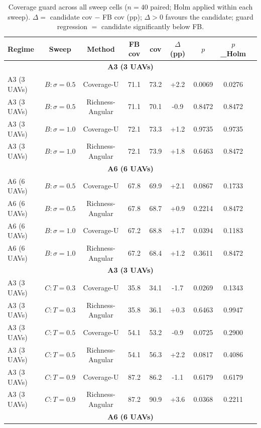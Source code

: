 \documentclass[journal]{IEEEtran}
\newcommand{\CU}{Coverage-U}
\newcommand{\RA}{Richness-Angular}
\begin{document}
\begin{table}[t]
\caption{Coverage guard across all sweep cells ($n = 40$ paired; Holm applied within each sweep). $\Delta =$ candidate cov $-$ FB cov (pp); $\Delta > 0$ favours the candidate; guard regression $=$ candidate significantly below FB.}
\label{tab:guard}
\centering
\small
\setlength{\tabcolsep}{4pt}
\begin{tabular}{l c c c c c c c c}
\toprule
Regime & Sweep & Method & FB cov & cov & $\Delta$ (pp) & $p$ & $p$\_Holm & \\
\midrule
\multicolumn{9}{c}{\textbf{A3 (3 UAVs)}} \\
\midrule
A3 (3 UAVs) & $B{:}\sigma{=}0.5$ & \CU & 71.1 & 73.2 & +2.2 & 0.0069 & 0.0276 &  \\
A3 (3 UAVs) & $B{:}\sigma{=}0.5$ & \RA & 71.1 & 70.1 & -0.9 & 0.8472 & 0.8472 &  \\
A3 (3 UAVs) & $B{:}\sigma{=}1.0$ & \CU & 72.1 & 73.3 & +1.2 & 0.9735 & 0.9735 &  \\
A3 (3 UAVs) & $B{:}\sigma{=}1.0$ & \RA & 72.1 & 73.9 & +1.8 & 0.6463 & 0.8472 &  \\
\multicolumn{9}{c}{\textbf{A6 (6 UAVs)}} \\
\midrule
A6 (6 UAVs) & $B{:}\sigma{=}0.5$ & \CU & 67.8 & 69.9 & +2.1 & 0.0867 & 0.1733 &  \\
A6 (6 UAVs) & $B{:}\sigma{=}0.5$ & \RA & 67.8 & 68.7 & +0.9 & 0.2214 & 0.8472 &  \\
A6 (6 UAVs) & $B{:}\sigma{=}1.0$ & \CU & 67.2 & 68.8 & +1.7 & 0.0394 & 0.1183 &  \\
A6 (6 UAVs) & $B{:}\sigma{=}1.0$ & \RA & 67.2 & 68.4 & +1.2 & 0.3611 & 0.8472 &  \\
\multicolumn{9}{c}{\textbf{A3 (3 UAVs)}} \\
\midrule
A3 (3 UAVs) & $C{:}T{=}0.3$ & \CU & 35.8 & 34.1 & -1.7 & 0.0269 & 0.1343 &  \\
A3 (3 UAVs) & $C{:}T{=}0.3$ & \RA & 35.8 & 36.1 & +0.3 & 0.6463 & 0.9947 &  \\
A3 (3 UAVs) & $C{:}T{=}0.5$ & \CU & 54.1 & 53.2 & -0.9 & 0.0725 & 0.2900 &  \\
A3 (3 UAVs) & $C{:}T{=}0.5$ & \RA & 54.1 & 56.3 & +2.2 & 0.0817 & 0.4086 &  \\
A3 (3 UAVs) & $C{:}T{=}0.9$ & \CU & 87.2 & 86.2 & -1.1 & 0.6179 & 0.6179 &  \\
A3 (3 UAVs) & $C{:}T{=}0.9$ & \RA & 87.2 & 90.9 & +3.6 & 0.0368 & 0.2211 &  \\
\multicolumn{9}{c}{\textbf{A6 (6 UAVs)}} \\

\end{tabular}
\end{table}
\end{document}
